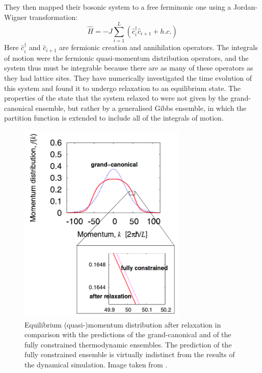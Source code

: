 \documentclass[a4paper, 10pt, draft]{article}
\theoremstyle{plain}
\begin{document}
They then mapped their bosonic system to a free ferminonic one using a
Jordan-Wigner transformation:
\begin{equation}
 \hat{H}=-J\sum_{i=1}^{L} (\hat{c}_{i}^{\dagger}\hat{c}_{i+1}+h.c.)
\end{equation}
Here $\hat{c}_{i}^{\dagger}$ and $\hat{c}_{i+1}$ are fermionic creation and
annihilation operators. The integrals of motion were the fermionic
quasi-momentum distribution operators, and the system thus must be
integrable because there are as many of these operators as they had lattice
sites. They have numerically investigated the time evolution of this system and
found it to undergo relaxation to an equilibrium state. The properties of the
state that the system relaxed to were not given by the grand-canonical
ensemble, but rather by a generalised Gibbs ensemble, in which the partition
function is extended to include all of the integrals of motion.


\begin{figure}[H]
    \begin{center}
        \includegraphics[width=8cm]{grand_canonical_vs_GGE}
    \end{center}
    \caption{Equilibrium (quasi-)momentum distribution after relaxation in
             comparison with the predictions of the grand-canonical and of the
             fully constrained thermodynamic ensembles. The prediction  of the
             fully constrained  ensemble  is virtually  indistinct from the
             results of the dynamical simulation. Image taken from
             \cite{Rigol2007}.}
 \end{figure}
\end{document}
